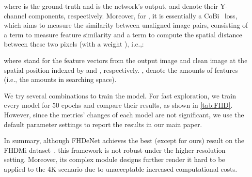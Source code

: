 \documentclass[runningheads]{llncs}
\newcommand{\ie}{i.e.}
\begin{document}
where  is the ground-truth and  is the network's output,  and  denote their Y-channel components, respectively. 
Moreover, for , it is essentially a CoBi~\cite{zhang2019zoom} loss, which aims to measure the similarity between unaligned image pairs, consisting of a term  to measure feature similarity and a term  to compute the spatial distance between these two pixels (with a weight ), \ie,:



where  stand for the feature vectors from the output image  and clean image  at the spatial position indexed by  and , respectively. ,  denote the amounts of features (\ie, the amounts in searching space).

We try several  combinations to train the model. For fast exploration, we train every model for 50 epochs and compare their results, as shown in \cref{tab:FHD}. However, since the metrics' changes of each model are not significant, we use the default parameter settings to report the results in our main paper.  

In summary, although FHDeNet achieves the best (except for ours) result on the FHDMi dataset~\cite{he2020fhde}, this framework is not robust under the higher resolution setting. Moreover, its complex module designs further render it hard to be applied to the 4K scenario due to unacceptable increased computational costs. 

\begin{table}[H]
\caption{Quantitative comparisons of different weights for training FHDeNet. ``A'' denotes the default model where ; ``B'' denotes ; ``C'' denotes ;  ``D'' denotes ; ``E'' denotes }
\centering
{}

\label{tab:FHD}
\end{table}
\end{document}
